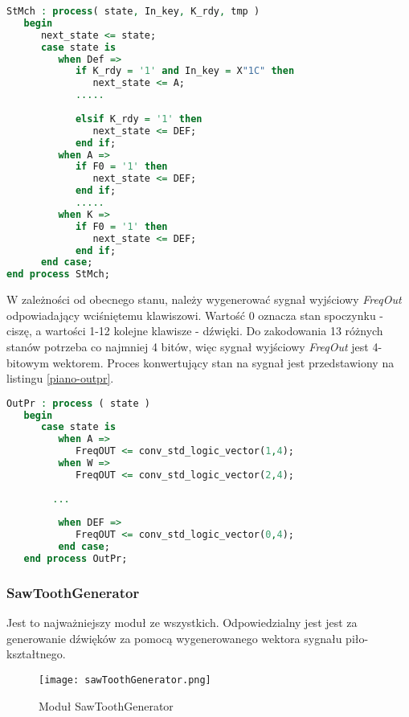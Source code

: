 \documentclass[11pt]{report}
\begin{document}
\begin{lstlisting}[label=piano-stmch,caption=Fragment procesu StMch,frame=tb,language=vhdl]
StMch : process( state, In_key, K_rdy, tmp )
   begin
      next_state <= state; 
      case state is      
         when Def =>
            if K_rdy = '1' and In_key = X"1C" then
               next_state <= A;
            .....
            
            elsif K_rdy = '1' then
               next_state <= DEF;
            end if;
         when A =>
            if F0 = '1' then
               next_state <= DEF;
            end if;
            .....
         when K =>
            if F0 = '1' then
               next_state <= DEF;
            end if;
      end case;
end process StMch;
\end{lstlisting}
W zależności od obecnego stanu, należy wygenerować sygnał wyjściowy \textit{FreqOut} odpowiadający wciśniętemu klawiszowi. Wartość 0 oznacza stan spoczynku - ciszę, a wartości 1-12 kolejne klawisze - dźwięki.  Do zakodowania 13 różnych stanów potrzeba co najmniej 4 bitów, więc sygnał wyjściowy \textit{FreqOut} jest 4-bitowym wektorem. Proces konwertujący stan na sygnał jest przedstawiony na listingu \ref{piano-outpr}.
\begin{lstlisting}[label=piano-outpr,caption=Fragment procesu OutPr,frame=tb,language=vhdl]
OutPr : process ( state )
   begin
      case state is
         when A =>
            FreqOUT <= conv_std_logic_vector(1,4);
         when W =>
            FreqOUT <= conv_std_logic_vector(2,4);
        
        ...
        
         when DEF =>
            FreqOUT <= conv_std_logic_vector(0,4);
         end case;
   end process OutPr;
\end{lstlisting}

\newpage

	\subsubsection{SawToothGenerator} 
	
	Jest to najważniejszy moduł ze wszystkich. Odpowiedzialny jest jest za  generowanie dźwięków za pomocą wygenerowanego wektora sygnału piło-kształtnego.
	
	
    \begin{figure}[h]
    	\centering
    	\texttt{[image: sawToothGenerator.png]}
    	\caption{Moduł SawToothGenerator}
	    \label{fig:sawtoothgen}
    \end{figure}
	
\end{document}
